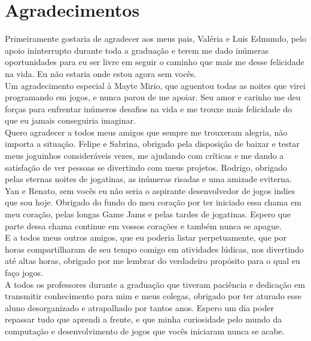 \chapter*{Agradecimentos}

Primeiramente gostaria de agradecer aos meus pais, Valéria e Luis Edmundo, pelo apoio ininterrupto durante toda a graduação e terem me dado inúmeras oportunidades para eu ser livre em seguir o caminho que mais me desse felicidade na vida. Eu não estaria onde estou agora sem vocês.\\

Um agradecimento especial à Mayte Mirio, que aguentou todas as noites que virei programando em jogos, e nunca parou de me apoiar. Seu amor e carinho me deu forças para enfrentar inúmeros desafios na vida e me trouxe mais felicidade do que eu jamais conseguiria imaginar.\\

Quero agradecer a todos meus amigos que sempre me trouxeram alegria, não importa a situação. Felipe e Sabrina, obrigado pela disposição de baixar e testar meus joguinhos consideráveis vezes, me ajudando com críticas e me dando a satisfação de ver pessoas se divertindo com meus projetos. Rodrigo, obrigado pelas eternas noites de jogatinas, as inúmeras risadas e uma amizade eviterna. Yan e Renato, sem vocês eu não seria o aspirante desenvolvedor de jogos indies que sou hoje. Obrigado do fundo do meu coração por ter iniciado essa chama em meu coração, pelas longas Game Jams e pelas tardes de jogatinas. Espero que parte dessa chama continue em vossos corações e também nunca se apague.\\

E a todos meus outros amigos, que eu poderia listar perpetuamente, que por horas compartilharam de seu tempo comigo em atividades lúdicas, nos divertindo até altas horas, obrigado por me lembrar do verdadeiro propósito para o qual eu faço jogos.\\

A todos os professores durante a graduação que tiveram paciência e dedicação em transmitir conhecimento para mim e meus colegas, obrigado por ter aturado esse aluno desorganizado e atrapalhado por tantos anos. Espero um dia poder repassar tudo que aprendi a frente, e que minha curiosidade pelo mundo da computação e desenvolvimento de jogos que vocês iniciaram nunca se acabe.\\


